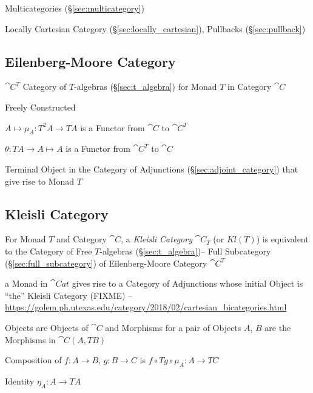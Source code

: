 Multicategories (\S\ref{sec:multicategory})

Locally Cartesian Category (\S\ref{sec:locally_cartesian}), Pullbacks
(\S\ref{sec:pullback})



\subsection{Eilenberg-Moore Category}\label{sec:eilenberg_moore}

$\cat{C}^T$ Category of $T$-algebras (\S\ref{sec:t_algebra}) for
Monad $T$ in Category $\cat{C}$

Freely Constructed

$A \mapsto \mu_A : T^2 A \rightarrow T A$ is a Functor from
$\cat{C}$ to $\cat{C}^T$

$\theta : T A \rightarrow A \mapsto A$ is a Functor from
$\cat{C}^T$ to $\cat{C}$

Terminal Object in the Category of Adjunctions
(\S\ref{sec:adjoint_category}) that give rise to Monad $T$



\subsection{Kleisli Category}\label{sec:kleisli_category}

For Monad $T$ and Category $\cat{C}$, a \emph{Kleisli Category}
$\cat{C}_T$ (or $Kl(T)$) is equivalent to the Category of Free
$T$-algebras (\S\ref{sec:t_algebra})-- Full Subcategory
(\S\ref{sec:full_subcategory}) of Eilenberg-Moore Category
$\cat{C}^T$

a Monad in $\cat{Cat}$ gives rise to a Category of Adjunctions whose initial
Object is ``the'' Kleisli Category (FIXME)
--\url{https://golem.ph.utexas.edu/category/2018/02/cartesian_bicategories.html}

Objects are Objects of $\cat{C}$ and Morphisms for a pair of
Objects $A$, $B$ are the Morphisms in $\cat{C}(A, T B)$

Composition of $f : A \rightarrow B$, $g : B \rightarrow C$ is $f
\circ T g \circ \mu_A : A \rightarrow TC$

Identity $\eta_A : A \rightarrow T A$

